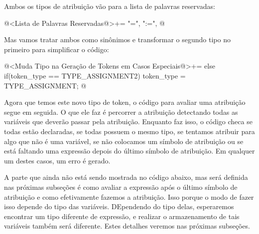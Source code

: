 Ambos os tipos de atribuição vão para a lista de palavras reservadas:

\iniciocodigo
@<Lista de Palavras Reservadas@>+=
"=", ":=",
@
\fimcodigo

Mas vamos tratar ambos como sinônimos e transformar o segundo tipo no
primeiro para simplificar o código:

\iniciocodigo
@<Muda Tipo na Geração de Tokens em Casos Especiais@>+=
else if(token_type == TYPE_ASSIGNMENT2)
  token_type = TYPE_ASSIGNMENT;
@
\fimcodigo

Agora que temos este novo tipo de token, o código para avaliar uma
atribuição segue em seguida. O que ele faz é percorrer a atribuição
detectando todas as variáveis que deverão passar pela
atribuição. Enquanto faz isso, o código checa se todas estão
declaradas, se todas possuem o mesmo tipo, se tentamos atribuir para
algo que não é uma variável, se não colocamos um símbolo de atribuição
ou se está faltando uma expressão depois do último símbolo de
atribuição. Em qualquer um destes casos, um erro é gerado.

A parte que ainda não está sendo mostrada no código abaixo, mas será
definida nas próximas subseções é como avaliar a expressão após o
último símbolo de atribuição e como efetivamente fazemos a
atribuição. Isso porque o modo de fazer isso depende do tipo das
variáveis. DEpendendo do tipo delas, esperaremos encontrar um tipo
diferente de expressão, e realizar o armazenamento de tais variáveis
também será diferente. Estes detalhes veremos nas próximas subseções.

